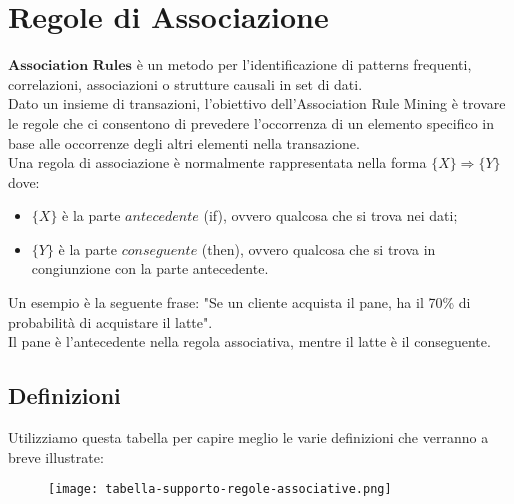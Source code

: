 \chapter{Regole di Associazione}
    $\textbf{Association Rules}$ è un metodo per l'identificazione di patterns frequenti, correlazioni, associazioni o strutture causali in set di dati.
    \\[1\baselineskip]
    Dato un insieme di transazioni, l'obiettivo dell'Association Rule Mining è trovare le regole che ci consentono di prevedere l'occorrenza di un elemento specifico in base alle occorrenze degli altri elementi nella transazione.
    \\[1\baselineskip]
    Una regola di associazione è normalmente rappresentata nella forma $\{X\} \Rightarrow \{Y\}$ dove:
        \begin{itemize}
            \item $\{X\}$ è la parte $\textit{antecedente}$ (if), ovvero qualcosa che si trova nei dati;
            \item $\{Y\}$ è la parte $\textit{conseguente}$ (then), ovvero qualcosa che si trova in congiunzione con la parte antecedente.
        \end{itemize}

    Un esempio è la seguente frase: "Se un cliente acquista il pane, ha il 70\% di probabilità di acquistare il latte".
    \\
    Il pane è l'antecedente nella regola associativa, mentre il latte è il conseguente.

    \clearpage

    \section{Definizioni}
        Utilizziamo questa tabella per capire meglio le varie definizioni che verranno a breve illustrate:
        
        \begin{figure}[h]
            \centering
            \texttt{[image: tabella-supporto-regole-associative.png]}
        \end{figure}

